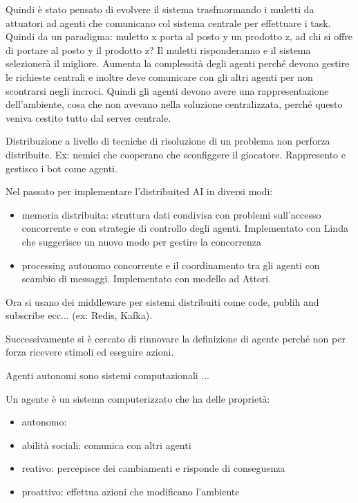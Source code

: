 Quindi è stato pensato di evolvere il sistema trasfmormando i muletti da
attuatori ad agenti che comunicano col sistema centrale per effettuare i task.
Quindi da un paradigma: muletto x porta al posto y un prodotto z, ad chi si offre
di portare al posto y il prodotto z? Il muletti risponderanno e il sistema selezionerà
il migliore. Aumenta la complessità degli agenti perché devono gestire le richieste
centrali e inoltre deve comunicare con gli altri agenti per non scontrarsi negli
incroci. Quindi gli agenti devono avere una rappresentazione dell'ambiente, cosa
che non avevano nella soluzione centralizzata, perché questo veniva cestito tutto
dal server centrale.

Distribuzione a livello di tecniche di risoluzione di un problema non perforza
distribuite. Ex: nemici che cooperano che sconfiggere il giocatore. Rappresento 
e gestisco i bot come agenti.

Nel passato per implementare l'distribuited AI in diversi modi:
\begin{itemize}
    \item memoria distribuita: struttura dati condivisa con problemi sull'accesso
    concorrente e con strategie di controllo degli agenti. Implementato con Linda 
    che suggerisce un nuovo modo per gestire la concorrenza
    \item processing autonomo concorrente e il coordinamento tra gli agenti 
    con scambio di messaggi. Implementato con modello ad Attori.
\end{itemize}
Ora si usano dei middleware per sistemi distribuiti come code, publih and subscribe 
ecc$\dots$ (ex: Redis, Kafka).

Successivamente si è cercato di rinnovare la definizione di agente perché non 
per forza ricevere stimoli ed eseguire azioni.
\begin{definizione} 
    Agenti autonomi sono sistemi computazionali ...
\end{definizione}

\begin{definizione} 
    Un agente è un sistema computerizzato che ha delle proprietà:
    \begin{itemize}
        \item autonomo: 
        \item abilità sociali: comunica con altri agenti
        \item reativo: percepisce dei cambiamenti e risponde di conseguenza
        \item proattivo: effettua azioni che modificano l'ambiente
    \end{itemize}
\end{definizione}

